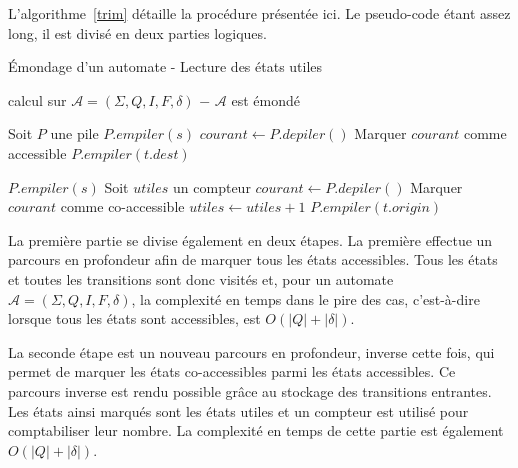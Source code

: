 	L'algorithme~\ref{trim} détaille la procédure présentée ici. Le pseudo-code étant assez long, il est divisé en deux parties logiques.
	
	\begin{algorithm}
		\caption{\'{E}mondage d'un automate - Lecture des états utiles}
		\label{trim}
		\begin{algorithmic}[1]
			\Require calcul sur $\mathscr{A} = (\Sigma,Q,I,F,\delta)$
			\Ensure $-$ $\mathscr{A}$ est émondé
			
			\Statex
			\Statex
			\State Soit $P$ une pile
					\State $P.empiler(s)$
				\EndIf
			\EndFor
			\Statex
				\State $courant \gets P.depiler()$
				\State Marquer $courant$ comme accessible
						\State $P.empiler(t.dest)$
					\EndIf
				\EndFor
			\EndWhile
			
			\Statex
			\Statex
					\State $P.empiler(s)$
				\EndIf
			\EndFor
			\Statex
			\State Soit $utiles$ un compteur
				\State $courant \gets P.depiler()$
				\State Marquer $courant$ comme co-accessible
					\State $utiles \gets utiles + 1$
				\EndIf
						\State $P.empiler(t.origin)$
					\EndIf
				\EndFor
			\EndWhile
			
			
		\end{algorithmic}
	\end{algorithm}
	
	La première partie se divise également en deux étapes. La première effectue un parcours en profondeur afin de marquer tous les états accessibles. Tous les états et toutes les transitions sont donc visités et, pour un automate $\mathscr{A} = (\Sigma, Q, I, F, \delta)$, la complexité en temps dans le pire des cas, c'est-à-dire lorsque tous les états sont accessibles, est $O(|Q| + |\delta|)$.
	
	\setcounter{algorithm}{0}
	
	La seconde étape est un nouveau parcours en profondeur, inverse cette fois, qui permet de marquer les états co-accessibles parmi les états accessibles. Ce parcours inverse est rendu possible grâce au stockage des transitions entrantes. Les états ainsi marqués sont les états utiles et un compteur est utilisé pour comptabiliser leur nombre.
	La complexité en temps de cette partie est également $O(|Q| + |\delta|)$.
	

